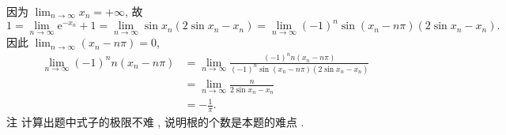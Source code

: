 \documentclass[10pt]{article}
\begin{document}
 因为  $\lim _{n \rightarrow \infty} x_{n}=+\infty$,  故 
$$
1=\lim _{n \rightarrow \infty} \mathrm{e}^{-x_{n}}+1=\lim _{n \rightarrow \infty} \sin x_{n}\left(2 \sin x_{n}-x_{n}\right)=\lim _{n \rightarrow \infty}(-1)^{n} \sin \left(x_{n}-n \pi\right)\left(2 \sin x_{n}-x_{n}\right) .
$$
 因此  $\lim _{n \rightarrow \infty}\left(x_{n}-n \pi\right)=0$,
$$
\begin{aligned}
\lim _{n \rightarrow \infty}(-1)^{n} n\left(x_{n}-n \pi\right) &=\lim _{n \rightarrow \infty} \frac{(-1)^{n} n\left(x_{n}-n \pi\right)}{(-1)^{n} \sin \left(x_{n}-n \pi\right)\left(2 \sin x_{n}-x_{n}\right)} \\
&=\lim _{n \rightarrow \infty} \frac{n}{2 \sin x_{n}-x_{n}} \\
&=-\frac{1}{\pi} .
\end{aligned}
$$
 注   计算出题中式子的极限不难 ,  说明根的个数是本题的难点 .
\end{document}
